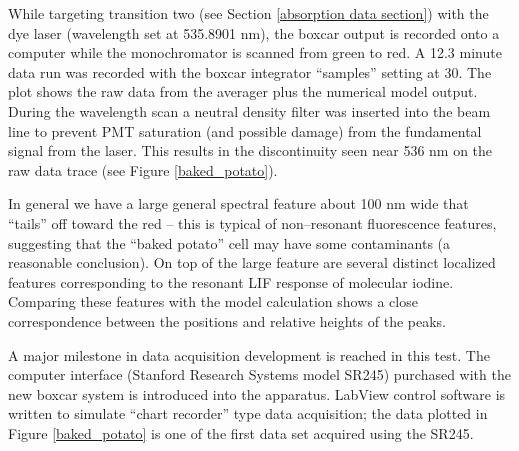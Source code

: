 
While targeting transition two (see Section \ref{absorption data section}) with the dye laser (wavelength set at 535.8901 nm), the boxcar output is recorded onto a computer while the monochromator is scanned from green to red. A 12.3 minute data run was recorded with the boxcar integrator ``samples'' setting at 30. The plot shows the raw data from the averager plus the numerical model output. During the wavelength scan a neutral density filter was inserted into the beam line to prevent PMT saturation (and possible damage) from the fundamental signal from the laser. This results in the discontinuity seen near 536 nm on the raw data trace (see Figure \ref{baked_potato}).

In general we have a large general spectral feature about 100 nm wide that ``tails'' off toward the red -- this is typical of non--resonant fluorescence features, suggesting that the ``baked potato'' cell may have some contaminants (a reasonable conclusion). On top of the large feature are several distinct localized features corresponding to the resonant LIF response of molecular iodine. Comparing these features with the model calculation shows a close correspondence between the positions and relative heights of the peaks.

A major milestone in data acquisition development is reached in this test. The computer interface (Stanford Research Systems model SR245) purchased with the new boxcar system is introduced into the apparatus. LabView control software is written to simulate ``chart recorder'' type data acquisition; the data plotted in Figure \ref{baked_potato} is one of the first data set acquired using the SR245.
